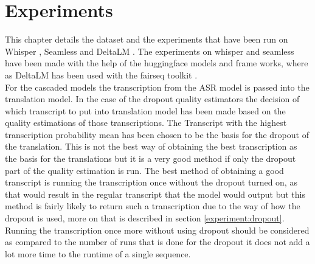 
\chapter{Experiments}
\label{ch:experiment}
This chapter details the dataset and the experiments that have been run on Whisper \cite{radford2022robust}, Seamless \cite{seamless2023} and DeltaLM \cite{ma2021deltalm}.
The experiments on whisper and seamless have been made with the help of the huggingface \cite{huggingface} models and frame works, where as DeltaLM has been used with the fairseq toolkit \cite{ott2019fairseqfastextensibletoolkit}.\\
For the cascaded models the transcription from the ASR model is passed into the translation model. 
In the case of the dropout quality estimators the decision of which transcript to put into translation model has been made based on the quality estimations of those transcriptions.
The Transcript with the highest transcription probability mean has been chosen to be the basis for the dropout of the translation. 
This is not the best way of obtaining the best transcription as the basis for the translations but it is a very good method if only the dropout part of the quality estimation is run. 
The best method of obtaining a good transcript is running the transcription once without the dropout turned on, as that would result in the regular transcript that the model would output but this method is fairly likely to return such a transcription due to the way of how the dropout is used, more on that is described in section \ref{experiment:dropout}.
Running the transcription once more without using dropout should be considered as compared to the number of runs that is done for the dropout it does not add a lot more time to the runtime of a single sequence.



